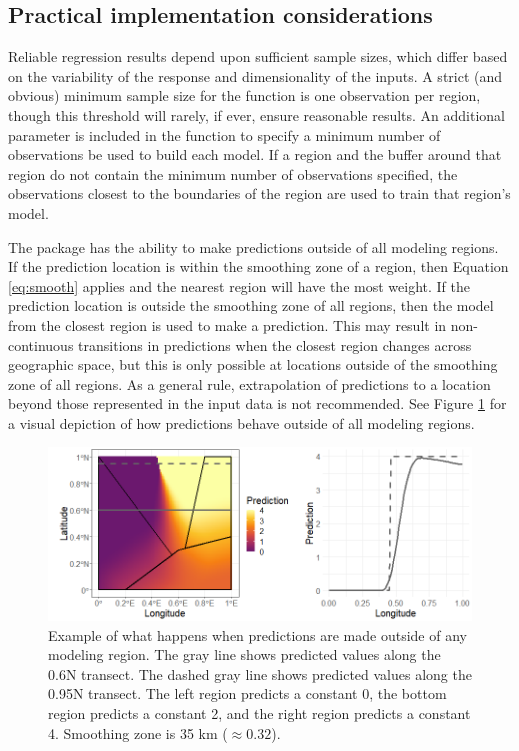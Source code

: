 \subsection{Practical implementation considerations}

Reliable regression results depend upon sufficient sample sizes, which differ based on the variability of the response and dimensionality of the inputs. A strict (and obvious) minimum sample size for the  function is one observation per region, though this threshold will rarely, if ever, ensure reasonable results. An additional parameter  is included in the  function to specify a minimum number of observations be used to build each model. If a region and the buffer around that region do not contain the minimum number of observations specified, the  observations closest to the boundaries of the region are used to train that region's model.

The  package has the ability to make predictions outside of all modeling regions. If the prediction location is within the smoothing zone of a region, then Equation \ref{eq:smooth} applies and the nearest region will have the most weight. If the prediction location is outside the smoothing zone of all regions, then the model from the closest region is used to make a prediction. This may result in non-continuous transitions in predictions when the closest region changes across geographic space, but this is only possible at locations outside of the smoothing zone of all regions. As a general rule, extrapolation of predictions to a location beyond those represented in the input data is not recommended. See Figure \ref{fig:gap} for a visual depiction of how predictions behave outside of all modeling regions.

\begin{figure}[htbp]
    \centering
    \includegraphics[width = \textwidth]{figures/gap.png}
    \caption{Example of what happens when predictions are made outside of any modeling region. The gray line shows predicted values along the 0.6\textdegree N transect. The dashed gray line shows predicted values along the 0.95\textdegree N transect. The left region predicts a constant 0, the bottom region predicts a constant 2, and the right region predicts a constant 4. Smoothing zone is 35 km ($\approx 0.32$\textdegree).}
    \label{fig:gap}
\end{figure}

